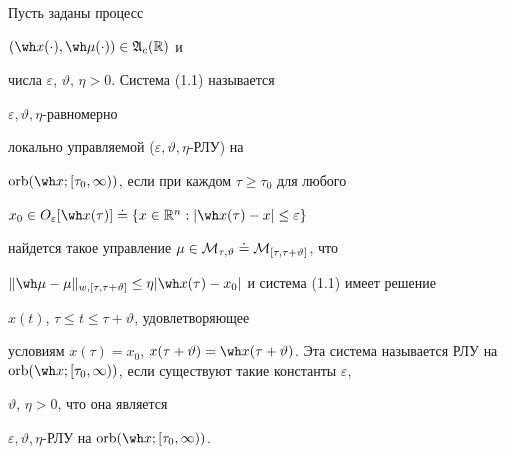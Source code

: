 \begin{defns}


Пусть заданы процесс


$(\wh x(\cdot),\wh\mu(\cdot))\in\frak A_c(\Bbb R)$ и


числа $\varepsilon$, $\vartheta$, $\eta>0$. Система (1.1) называется


$\varepsilon, \vartheta, \eta$-равномерно


локально управляемой ($\varepsilon,\vartheta,\eta$-РЛУ) на


$\orb(\wh x;[\tau_0,\infty))$, если при каждом $\tau\ge\tau_0$ для любого


$x_0\in O_{\varepsilon}[\wh x(\tau)]


\doteq\{x\in\Bbb R^n:|\wh x(\tau)-x|\le\varepsilon\}$


найдется такое управление $\mu\in\cal M_{\tau,\vartheta}


\doteq\cal M_{[\tau,\tau+\vartheta]}$, что


$\|\wh\mu-\mu\|_{w,[\tau,\tau+\vartheta]}


\le\eta|\wh x(\tau)-x_0|$ и система (1.1) имеет решение


$x(t)$, $\tau\le t\le\tau+\vartheta$, удовлетворяющее


условиям $x(\tau)=x_0$, $x(\tau+\vartheta)=\wh


x(\tau+\vartheta)$. Эта система называется РЛУ на $\orb(\wh


x;[\tau_0,\infty))$, если существуют такие константы $\varepsilon$,


$\vartheta$, $\eta>0$, что она является


$\varepsilon,\vartheta,\eta$-РЛУ на $\orb(\wh x;[\tau_0,\infty))$.


\end{defns}








